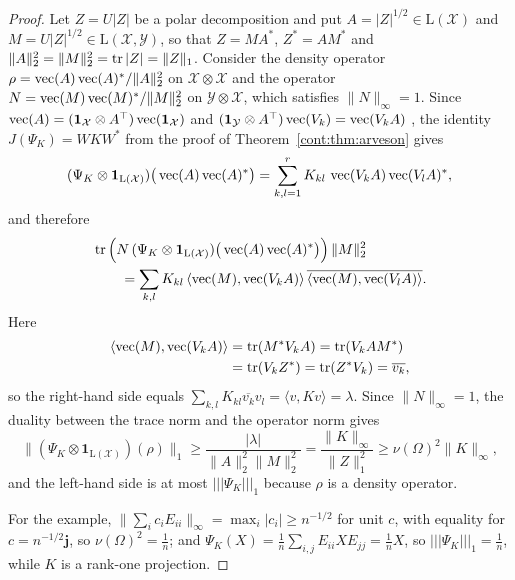 \begin{proof}
Let $Z=U|Z|$ be a polar decomposition and put $A=|Z|^{1/2}\in\mathrm{L}(\mathcal{X})$ and $M=U|Z|^{1/2}\in\mathrm{L}(\mathcal{X},\mathcal{Y})$, so that $Z=MA^*$, $Z^*=AM^*$ and $\|A\|_2^2=\|M\|_2^2=\operatorname{tr}|Z|=\|Z\|_1$. Consider the density operator $\rho=\operatorname{vec}(A)\operatorname{vec}(A)^*/\|A\|_2^2$ on $\mathcal{X}\otimes\mathcal{X}$ and the operator $N=\operatorname{vec}(M)\operatorname{vec}(M)^*/\|M\|_2^2$ on $\mathcal{Y}\otimes\mathcal{X}$, which satisfies $\|N\|_\infty=1$. Since $\operatorname{vec}(A)=(\mathbf{1}_{\mathcal{X}}\otimes A^\top)\operatorname{vec}(\mathbf{1}_{\mathcal{X}})$ and $(\mathbf{1}_{\mathcal{Y}}\otimes A^\top)\operatorname{vec}(V_k)=\operatorname{vec}(V_kA)$ \cite[Section~1.1.2]{watrous2018theory}, the identity $J(\Psi_K)=WKW^*$ from the proof of Theorem~\ref{cont:thm:arveson} gives
\[
(\Psi_K\otimes\mathbf{1}_{\mathrm{L}(\mathcal{X})})\big(\operatorname{vec}(A)\operatorname{vec}(A)^*\big)=\sum_{k,l=1}^rK_{kl}\,\operatorname{vec}(V_kA)\operatorname{vec}(V_lA)^*,
\]
and therefore
\begin{align*}
&\operatorname{tr}\Big(N\,(\Psi_K\otimes\mathbf{1}_{\mathrm{L}(\mathcal{X})})\big(\operatorname{vec}(A)\operatorname{vec}(A)^*\big)\Big)\,\|M\|_2^2\\
&\qquad=\sum_{k,l}K_{kl}\,\langle\operatorname{vec}(M),\operatorname{vec}(V_kA)\rangle\,\overline{\langle\operatorname{vec}(M),\operatorname{vec}(V_lA)\rangle}.
\end{align*}
Here
\begin{align*}
\langle\operatorname{vec}(M),\operatorname{vec}(V_kA)\rangle&=\operatorname{tr}(M^*V_kA)=\operatorname{tr}(V_kAM^*)\\
&=\operatorname{tr}(V_kZ^*)=\operatorname{tr}(Z^*V_k)=\overline{v_k},
\end{align*}
so the right-hand side equals $\sum_{k,l}K_{kl}\overline{v_k}v_l=\langle v,Kv\rangle=\lambda$. Since $\|N\|_\infty=1$, the duality between the trace norm and the operator norm gives
\[
\big\|(\Psi_K\otimes\mathbf{1}_{\mathrm{L}(\mathcal{X})})(\rho)\big\|_1\geq\frac{|\lambda|}{\|A\|_2^2\|M\|_2^2}=\frac{\|K\|_\infty}{\|Z\|_1^2}\geq\nu(\Omega)^2\|K\|_\infty ,
\]
and the left-hand side is at most $|||\Psi_K|||_1$ because $\rho$ is a density operator.

For the example, $\|\sum_ic_iE_{ii}\|_\infty=\max_i|c_i|\geq n^{-1/2}$ for unit $c$, with equality for $c=n^{-1/2}\mathbf{j}$, so $\nu(\Omega)^2=\frac1n$; and $\Psi_K(X)=\frac1n\sum_{i,j}E_{ii}XE_{jj}=\frac1nX$, so $|||\Psi_K|||_1=\frac1n$, while $K$ is a rank-one projection.
\end{proof}

